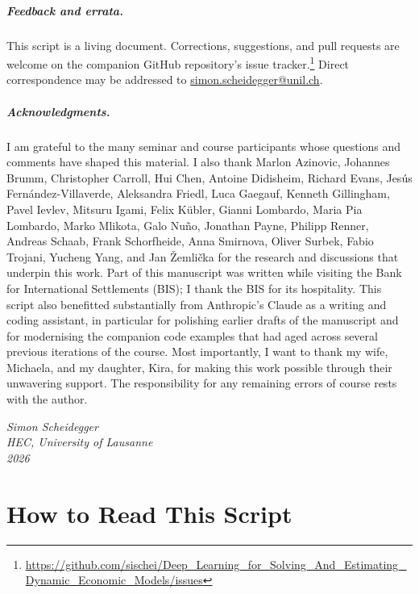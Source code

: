 \documentclass[11pt,a4paper]{report}
\begin{document}
\paragraph{Feedback and errata.}
This script is a living document.  Corrections, suggestions, and pull requests are welcome on the companion GitHub repository's issue tracker.\footnote{\url{https://github.com/sischei/Deep_Learning_for_Solving_And_Estimating_Dynamic_Economic_Models/issues}}  Direct correspondence may be addressed to \href{mailto:simon.scheidegger@unil.ch}{simon.scheidegger@unil.ch}.

\paragraph{Acknowledgments.}
I am grateful to the many seminar and course participants whose questions and comments have shaped this material.  I also thank Marlon Azinovic, Johannes Brumm, Christopher Carroll, Hui Chen, Antoine Didisheim, Richard Evans, Jes\'us Fern\'andez-Villaverde, Aleksandra Friedl, Luca Gaegauf, Kenneth Gillingham, Pavel Ievlev, Mitsuru Igami, Felix K\"ubler, Gianni Lombardo, Maria Pia Lombardo, Marko Mlikota, Galo Nu\~no, Jonathan Payne, Philipp Renner, Andreas Schaab, Frank Schorfheide, Anna Smirnova, Oliver Surbek, Fabio Trojani, Yucheng Yang, and Jan {\v Z}emli{\v c}ka for the research and discussions that underpin this work.  Part of this manuscript was written while visiting the Bank for International Settlements (BIS); I thank the BIS for its hospitality.  This script also benefitted substantially from Anthropic's Claude as a writing and coding assistant, in particular for polishing earlier drafts of the manuscript and for modernising the companion code examples that had aged across several previous iterations of the course.  Most importantly, I want to thank my wife, Michaela, and my daughter, Kira, for making this work possible through their unwavering support.  The responsibility for any remaining errors of course rests with the author.

\vspace{1em}
\noindent\textit{Simon Scheidegger}\\
\textit{HEC, University of Lausanne}\\
\textit{2026}

\chapter*{How to Read This Script}
\end{document}
